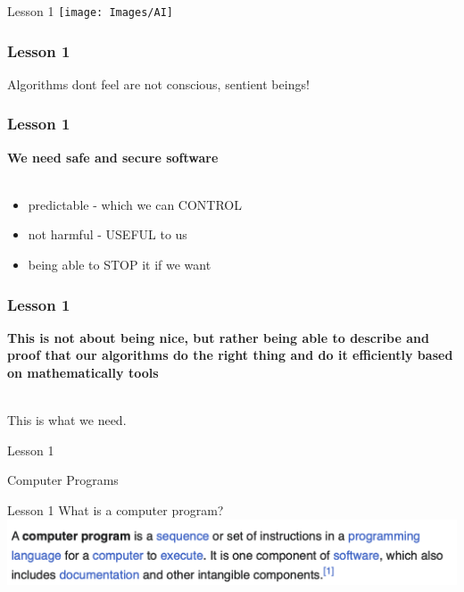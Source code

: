 \documentclass[aspectratio=1610]{beamer}
\begin{document}
\begin{frame}{Lesson 1}{}
\texttt{[image: Images/AI]}
\end{frame}


\begin{frame}
\frametitle{Lesson 1}

\Huge Algorithms 
\alert{dont feel} are not 
 \alert{conscious},
 \alert{sentient beings}!
\end{frame}



\begin{frame}
\frametitle{Lesson 1}
\huge
\textbf {We need safe and secure software\\~\\}
\begin{itemize}
	 \item predictable - \alert{which we can CONTROL}
	 \item not harmful - \alert{USEFUL to us}
	 \item \alert{being able to STOP it if we want}
\end{itemize}
\end{frame}


\begin{frame}
\frametitle{Lesson 1}
\huge
\textbf {This is not about being nice, but rather being able to describe and proof that our algorithms do the right thing and do it efficiently based on mathematically tools\\~\\}

This is what we need.
\end{frame}




\begin{frame}{Lesson 1}{}
\begin{center}
\Huge Computer Programs
\end{center}
\end{frame}


\begin{frame}{Lesson 1}{}
{\Huge{What is a computer program?}}
\includegraphics[scale=0.67]{Images/program}
\end{frame}
\end{document}
